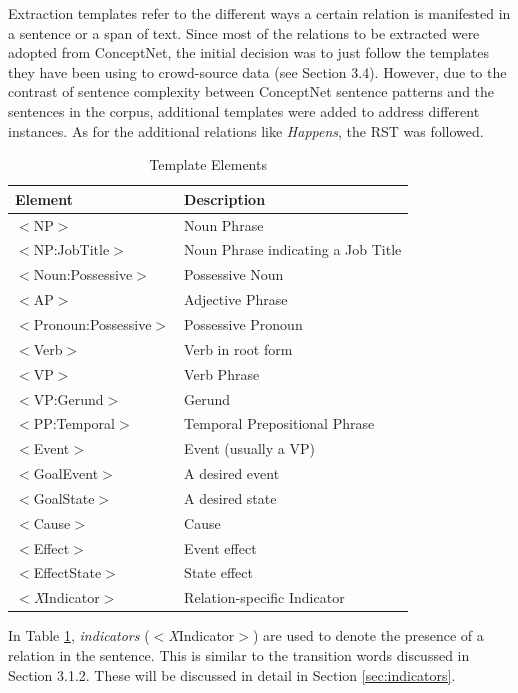 Extraction templates refer to the different ways a certain relation is manifested in a sentence or a span of text. Since most of the relations to be extracted were adopted from ConceptNet, the initial decision was to just follow the templates they have been using to crowd-source data (see Section 3.4). However, due to the contrast of sentence complexity between ConceptNet sentence patterns and the sentences in the corpus, additional templates were added to address different instances. As for the additional relations like \textit{Happens}, the RST was followed.

\begin{table}[H]   %
\centering
\caption{Template Elements} \vspace{0.25em}
\begin{tabular}{|p{4cm}|p{6.5cm}|} \hline
Element & Description \\ \hline
$<$NP$>$					& Noun Phrase \\ \hline
$<$NP:JobTitle$>$			& Noun Phrase indicating a Job Title \\ \hline
$<$Noun:Possessive$>$		& Possessive Noun \\ \hline
$<$AP$>$					& Adjective Phrase \\ \hline
$<$Pronoun:Possessive$>$	& Possessive Pronoun \\ \hline
$<$Verb$>$					& Verb in root form \\ \hline
$<$VP$>$					& Verb Phrase \\ \hline
$<$VP:Gerund$>$				& Gerund \\ \hline
$<$PP:Temporal$>$			& Temporal Prepositional Phrase \\ \hline
$<$Event$>$					& Event (usually a VP) \\ \hline
$<$GoalEvent$>$				& A desired event \\ \hline
$<$GoalState$>$				& A desired state \\ \hline
$<$Cause$>$					& Cause \\ \hline
$<$Effect$>$				& Event effect \\ \hline
$<$EffectState$>$			& State effect \\ \hline
$<$\textit{X}Indicator$>$	& Relation-specific Indicator \\ \hline
\end{tabular}
\label{tab:templateelements}
\end{table}

In Table \ref{tab:templateelements}, \textit{indicators} ($<$\textit{X}Indicator$>$) are used to denote the presence of a relation in the sentence. This is similar to the transition words discussed in Section 3.1.2. These will be discussed in detail in Section  \ref{sec:indicators}.

